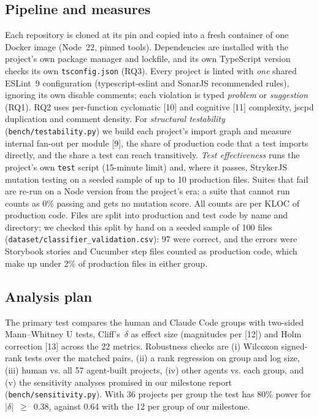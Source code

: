 \documentclass[10pt,conference]{IEEEtran}
\begin{document}
\subsection{Pipeline and measures}
Each repository is cloned at its pin and copied into a fresh container of one Docker image (Node~22, pinned tools). Dependencies are installed with the project's own package manager and lockfile, and its own TypeScript version checks its own \texttt{tsconfig.json} (RQ3). Every project is linted with \emph{one} shared ESLint~9 configuration (typescript-eslint and SonarJS recommended rules), ignoring its own disable comments; each violation is typed \emph{problem} or \emph{suggestion} (RQ1). RQ2 uses per-function cyclomatic [10] and cognitive [11] complexity, jscpd duplication and comment density. For \emph{structural testability} (\texttt{bench/testability.py}) we build each project's import graph and measure internal fan-out per module [9], the share of production code that a test imports directly, and the share a test can reach transitively. \emph{Test effectiveness} runs the project's own \texttt{test} script (15-minute limit) and, where it passes, StrykerJS mutation testing on a seeded sample of up to 10 production files. Suites that fail are re-run on a Node version from the project's era; a suite that cannot run counts as 0\% passing and gets no mutation score. All counts are per KLOC of production code. Files are split into production and test code by name and directory; we checked this split by hand on a seeded sample of 100 files (\texttt{dataset/classifier\_validation.csv}): 97 were correct, and the errors were Storybook stories and Cucumber step files counted as production code, which make up under 2\% of production files in either group.

\subsection{Analysis plan}
The primary test compares the human and Claude Code groups with two-sided Mann--Whitney U tests, Cliff's~$\delta$ as effect size (magnitudes per [12]) and Holm correction [13] across the 22 metrics. Robustness checks are (i) Wilcoxon signed-rank tests over the matched pairs, (ii) a rank regression on group and log size, (iii) human vs. all 57 agent-built projects, (iv) other agents vs. each group, and (v) the sensitivity analyses promised in our milestone report (\texttt{bench/sensitivity.py}). With 36 projects per group the test has 80\% power for |$\delta$|~$\geq$~0.38, against 0.64 with the 12 per group of our milestone.
\end{document}

